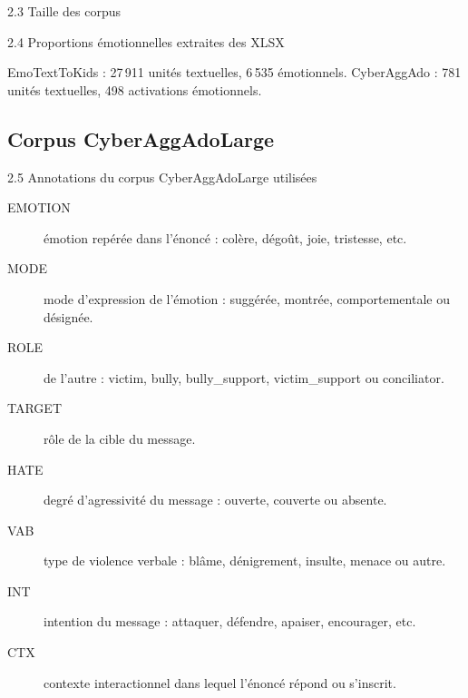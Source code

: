 \documentclass[aspectratio=169,10pt,xcolor=table]{beamer}
\begin{document}
\begin{frame}{2.3 Taille des corpus}
\centering
\vspace{1.0em}
\small

\end{frame}

\begin{frame}{2.4 Proportions émotionnelles extraites des XLSX}
\centering
\scriptsize


\vspace{0.6em}
{\footnotesize\color{emotycMuted}EmoTextToKids : 27\,911 unités textuelles, 6\,535 émotionnels. CyberAggAdo : 781 unités textuelles, 498 activations émotionnels.}
\end{frame}

\subsection{Corpus CyberAggAdoLarge}

\begin{frame}{2.5 Annotations du corpus CyberAggAdoLarge utilisées}
\footnotesize
\begin{description}
  \item[EMOTION] émotion repérée dans l'énoncé : colère, dégoût, joie, tristesse, etc.
  \item[MODE] mode d'expression de l'émotion : suggérée, montrée, comportementale ou désignée.
  \item[ROLE] de l'autre : victim, bully, bully\_support, victim\_support ou conciliator.
  \item[TARGET] rôle de la cible du message.
  \item[HATE] degré d'agressivité du message : ouverte, couverte ou absente.
  \item[VAB] type de violence verbale : blâme, dénigrement, insulte, menace ou autre.
  \item[INT] intention du message : attaquer, défendre, apaiser, encourager, etc.
  \item[CTX] contexte interactionnel dans lequel l'énoncé répond ou s'inscrit.
\end{description}
\end{frame}
\end{document}

